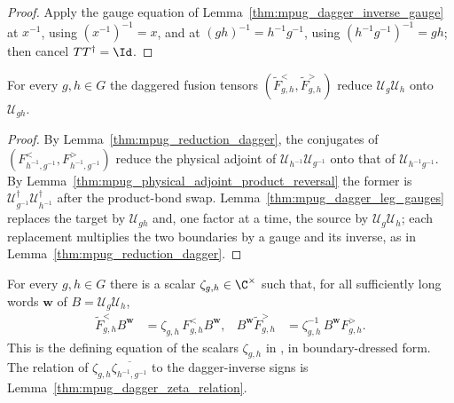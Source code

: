 \begin{proof}\leanok
    Apply the gauge equation of Lemma~\ref{thm:mpug_dagger_inverse_gauge}
    at $x^{-1}$, using $(x^{-1})^{-1}=x$, and at
    $(gh)^{-1}=h^{-1}g^{-1}$, using $(h^{-1}g^{-1})^{-1}=gh$; then cancel
    $T T^\dagger=\Id$.
\end{proof}

\begin{lemma}
    \label{thm:mpug_dagger_fusion_reduction}
    \leanok
    For every $g,h\in G$ the daggered fusion tensors
    $(\widetilde F^<_{g,h},\widetilde F^>_{g,h})$ reduce
    $\mathcal U_g\mathcal U_h$ onto $\mathcal U_{gh}$.
\end{lemma}

\begin{proof}\leanok
    By Lemma~\ref{thm:mpug_reduction_dagger}, the conjugates of
    $(F^<_{h^{-1},g^{-1}},F^>_{h^{-1},g^{-1}})$ reduce the physical adjoint of
    $\mathcal U_{h^{-1}}\mathcal U_{g^{-1}}$ onto that of
    $\mathcal U_{h^{-1}g^{-1}}$. By
    Lemma~\ref{thm:mpug_physical_adjoint_product_reversal} the former is
    $\mathcal U^\dagger_{g^{-1}}\mathcal U^\dagger_{h^{-1}}$ after the
    product-bond swap. Lemma~\ref{thm:mpug_dagger_leg_gauges} replaces the
    target by $\mathcal U_{gh}$ and, one factor at a time, the source by
    $\mathcal U_g\mathcal U_h$; each replacement multiplies the two boundaries
    by a gauge and its inverse, as in Lemma~\ref{thm:mpug_reduction_dagger}.
\end{proof}

\begin{lemma}
    \label{thm:mpug_dagger_zeta}
    \leanok
    For every $g,h\in G$ there is a scalar $\zeta_{g,h}\in\C^\times$ such that,
    for all sufficiently long words $\mathbf w$ of $B=\mathcal U_g\mathcal U_h$,
    \begin{align}
        \widetilde F^<_{g,h}B^{\mathbf w} & =\zeta_{g,h}\,F^<_{g,h}B^{\mathbf w},      &
        B^{\mathbf w}\widetilde F^>_{g,h} & =\zeta_{g,h}^{-1}\,B^{\mathbf w}F^>_{g,h}.
    \end{align}
    This is the defining equation of the scalars $\zeta_{g,h}$ in
    \cite[lines~1570--1637]{FrancoRubio2025MPUGauging}, in boundary-dressed
    form. The relation of $\zeta_{g,h}\overline{\zeta_{h^{-1},g^{-1}}}$ to the
    dagger-inverse signs is Lemma~\ref{thm:mpug_dagger_zeta_relation}.
\end{lemma}

